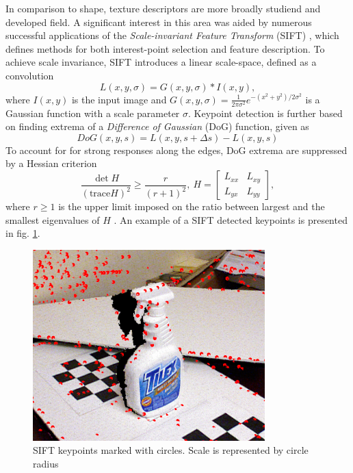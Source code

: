 In comparison to shape, texture descriptors are more broadly studiend and developed field. A significant interest in this area was aided by numerous successful applications \cite{ORB} of the \textit{Scale-invariant Feature Transform} (SIFT) \cite{SIFT}, which defines methods for both interest-point selection and feature description. To achieve scale invariance, SIFT introduces a linear scale-space, defined as a convolution
\begin{equation}
L(x,y,\sigma) = G(x,y,\sigma) \ast I(x,y),
\label{eq:scalelinear}
\end{equation}
where $I(x,y)$ is the input image and $G(x,y,\sigma) = \frac{1}{2\pi\sigma^2}e^{-(x^2 + y^2)/2\sigma^2}$ is a Gaussian function with a scale parameter $\sigma$. Keypoint detection is further based on finding extrema of a \textit{Difference of Gaussian} (DoG) function, given as
\begin{equation}
DoG(x,y,s) = L(x,y,s + \Delta s) - L(x,y,s)
\end{equation}
To account for for strong responses along the edges, DoG extrema are suppressed by a Hessian criterion
\begin{equation}
\frac{\det H}{(\mathrm{trace} H)^2} \geq \frac{r}{(r+1)^2},\ H = \begin{bmatrix}
L_{xx} & L_{xy} \\
L_{yx} & L_{yy} 
\end{bmatrix},
\end{equation}
where $r \geq 1$ is the upper limit imposed on the ratio between largest and the smallest eigenvalues of $H$ \cite{SiftScholarpedia}. An example of a SIFT detected keypoints is presented in fig. \ref{fig:sift}.

\begin{figure}[ht]
\centering
\includegraphics[width=0.8\textwidth]{fig/ISS}
\caption{SIFT keypoints marked with circles. Scale is represented by circle radius}
\label{fig:sift}
\end{figure}

